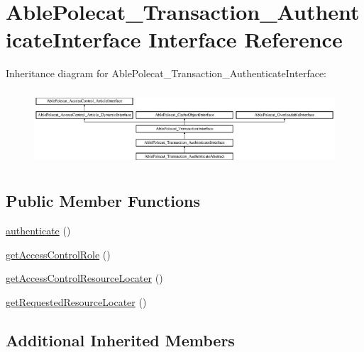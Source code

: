 \hypertarget{interface_able_polecat___transaction___authenticate_interface}{}\section{Able\+Polecat\+\_\+\+Transaction\+\_\+\+Authenticate\+Interface Interface Reference}
\label{interface_able_polecat___transaction___authenticate_interface}
Inheritance diagram for Able\+Polecat\+\_\+\+Transaction\+\_\+\+Authenticate\+Interface\+:\begin{figure}[H]
\begin{center}
\leavevmode
\includegraphics[height=2.845528cm]{interface_able_polecat___transaction___authenticate_interface}
\end{center}
\end{figure}
\subsection*{Public Member Functions}
\begin{DoxyCompactItemize}
\item 
\hyperlink{interface_able_polecat___transaction___authenticate_interface_a750c93a7dfab5314f2bf662a407bc5a6}{authenticate} ()
\item 
\hyperlink{interface_able_polecat___transaction___authenticate_interface_a3e160a8e954ef2c9421f3ed57a18bae0}{get\+Access\+Control\+Role} ()
\item 
\hyperlink{interface_able_polecat___transaction___authenticate_interface_a59afdf20b5859ddd4d6bbc77aa253705}{get\+Access\+Control\+Resource\+Locater} ()
\item 
\hyperlink{interface_able_polecat___transaction___authenticate_interface_a86aa497c7d66dac50b6a267039a5afa1}{get\+Requested\+Resource\+Locater} ()
\end{DoxyCompactItemize}
\subsection*{Additional Inherited Members}


